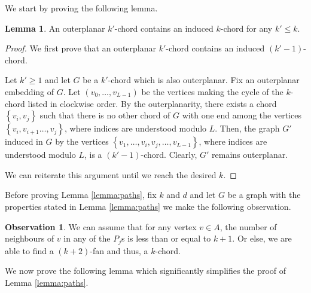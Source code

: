 \documentclass[12pt]{article}
\theoremstyle{definition}
\newtheorem{lemma}[thm]{Lemma}
\newtheorem{obs}[thm]{Observation}
\begin{document}
    We start by proving the following
    lemma.

    \begin{lemma} \label{lemma:outerplanar}
        An outerplanar $k'$-chord contains
        an induced $k$-chord for any $k' \leq k$.
    \end{lemma}
    \begin{proof}
        We first prove that an outerplanar
        $k'$-chord contains an induced
        $\left(k'-1\right)$-chord.

        Let $k' \geq 1$ and let $G$ 
        be a $k'$-chord which is also 
        outerplanar. Fix an outerplanar
        embedding of $G$.
        Let $\left(v_0, \ldots, v_{L-1}\right)$ 
        be the vertices making the cycle
        of the $k$-chord listed in clockwise
        order. By the outerplanarity,
        there exists a chord $\left\{v_{i}, v_{j}\right\}$ 
        such that there is no other chord
        of $G$ with one end among the
        vertices $\left\{v_{i}, v_{i+1} \ldots, v_{j}\right\}$,
        where indices are understood modulo $L$.
        Then, the graph $G'$ induced in $G$ by
        the vertices $\left\{v_1, \ldots, v_{i},
        v_{j}, \ldots, v_{L-1}\right\}$,
        where indices are understood modulo $L$,
        is a $\left(k'-1\right)$-chord.
        Clearly, $G'$ remains outerplanar.

        We can reiterate this argument until 
        we reach the desired $k$.
    \end{proof}
    
    Before proving Lemma \ref{lemma:paths},
    fix $k$ and $d$ and let $G$ be a graph
    with the properties stated in Lemma \ref{lemma:paths}
    we make the following observation.

    \begin{obs} \label{obs:kfan}
        We can assume that
        for any vertex $v \in A$,
        the number of neighbours of $v$ in any of
        the $P_{j}$s is less than or
        equal to $k+1$. Or else, we
        are able to find a
        $\left(k+2\right)$-fan and thus,
        a $k$-chord.
    \end{obs}

    We now prove the following lemma
    which significantly simplifies
    the proof of Lemma \ref{lemma:paths}.
    
\end{document}
